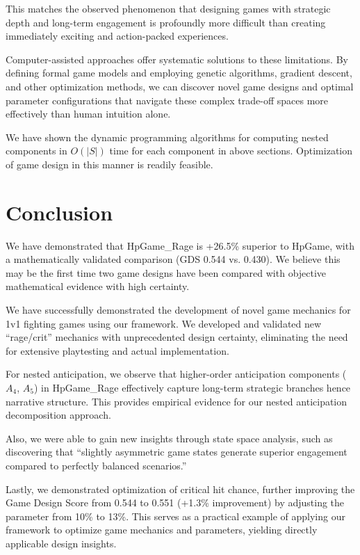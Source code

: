 \documentclass{article}
\begin{document}
This matches the observed phenomenon that designing games with strategic depth and long-term engagement is profoundly more difficult than creating immediately exciting and action-packed experiences.

Computer-assisted approaches offer systematic solutions to these limitations. By defining formal game models and employing genetic algorithms, gradient descent, and other optimization methods, we can discover novel game designs and optimal parameter configurations that navigate these complex trade-off spaces more effectively than human intuition alone.

We have shown the dynamic programming algorithms for computing nested components in $O(|S|)$ time for each component in above sections. Optimization of game design in this manner is readily feasible.

\section{Conclusion}

We have demonstrated that HpGame\_Rage is +26.5\% superior to HpGame, with a mathematically validated comparison (GDS 0.544 vs. 0.430).
We believe this may be the first time two game designs have been compared with objective mathematical evidence with high certainty.

We have successfully demonstrated the development of novel game mechanics for 1v1 fighting games using our framework. We developed and validated new ``rage/crit'' mechanics with unprecedented design certainty, eliminating the need for extensive playtesting and actual implementation.

For nested anticipation, we observe that higher-order anticipation components ($A_4$, $A_5$) in HpGame\_Rage effectively capture long-term strategic branches hence narrative structure.
This provides empirical evidence for our nested anticipation decomposition approach.

Also, we were able to gain new insights through state space analysis, such as discovering that ``slightly asymmetric game states generate superior engagement compared to perfectly balanced scenarios.''

Lastly, we demonstrated optimization of critical hit chance, further improving the Game Design Score from 0.544 to 0.551 (+1.3\% improvement) by adjusting the parameter from 10\% to 13\%. This serves as a practical example of applying our framework to optimize game mechanics and parameters, yielding directly applicable design insights.
\end{document}
